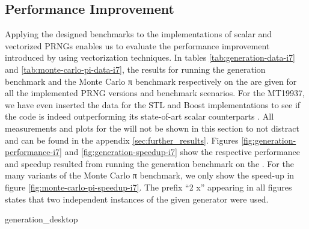 \documentclass{stdlocal}
\begin{document}
  \subsection{Performance Improvement} %
  \label{sub:performance_improvement}
    Applying the designed benchmarks to the implementations of scalar and vectorized PRNGs enables us to evaluate the performance improvement introduced by using vectorization techniques.
    In tables \ref{tab:generation-data-i7} and \ref{tab:monte-carlo-pi-data-i7}, the results for running the generation benchmark and the Monte Carlo π benchmark respectively on the  are given for all the implemented PRNG versions and benchmark scenarios.
    For the MT19937, we have even inserted the data for the STL and Boost implementations to see if the code is indeed outperforming its state-of-art scalar counterparts \autocite{boost,gcc-libstdcpp}.
    All measurements and plots for the  will not be shown in this section to not distract and can be found in the appendix \ref{sec:further_results}.
    Figures \ref{fig:generation-performance-i7} and \ref{fig:generation-speedup-i7} show the respective performance and speedup resulted from running the generation benchmark on the .
    For the many variants of the Monte Carlo π benchmark, we only show the speed-up in figure \ref{fig:monte-carlo-pi-speedup-i7}.
    The prefix \enquote{2 x} appearing in all figures states that two independent instances of the given generator were used.

    \begin{table}[H]
      \center
      \caption[Generation Benchmark Data for ]{%
        The table shows the results achieved by running the generation benchmark on the  at a frequency of $4.51\appendUnit{GHz}$ with all implemented variants of given PRNGs.
        While running the benchmark, $16\appendUnit{GiB}$ of random numbers were generated and temporarily stored in a cache of size $16384\appendUnit{B}$ by iterating $2^{20}$ times over its content.
        During the execution, there were no cache or branch misses.
        The values for cycles, instructions, and IPCs were averaged over the calls to the advancing routine of the respective generator.
      }
      \label{tab:generation-data-i7}
      \footnotesize
      \renewcommand{\arraystretch}{1.2}
      {generation_desktop}
    \end{table}
\end{document}
